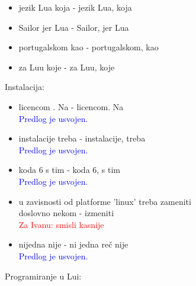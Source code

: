\documentclass[a4paper]{report}
\newcommand{\odgovorAutora}[1]{\textcolor{blue}{#1}}
\newcommand{\note}[1]{\textcolor{red}{#1}}
\begin{document}
\begin{itemize}
  \item jezik Lua koja - jezik Lua, koja 
  \item Sailor jer Lua - Sailor, jer Lua 
  \item portugalskom kao - portugalskom, kao  
  \item  za Luu koje -  za Luu, koje
\end{itemize}
Instalacija:
\begin{itemize}
  \item licencom . Na - licencom. Na \\
  \odgovorAutora{Predlog je usvojen.}
  \item instalacije treba  - instalacije, treba \\
  \odgovorAutora{Predlog je usvojen.} 
  \item  koda 6 s tim -  koda 6, s tim \\
  \odgovorAutora{Predlog je usvojen.}
  \item  u zavisnosti od platforme ’linux’ treba zameniti \\ doslovno nekom - izmeniti \\
  \note{Za Ivanu: smisli kasnije}
  \item  nijedna nije - ni jedna reč nije \\
  \odgovorAutora{Predlog je usvojen.}
\end{itemize}
Programiranje u Lui: 
\end{document}
